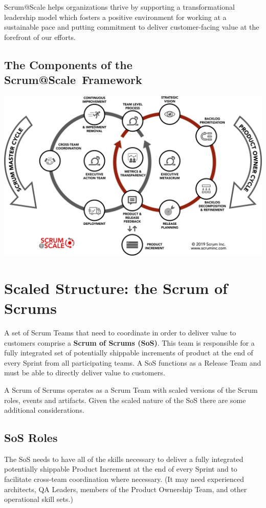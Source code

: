 \documentclass[12pt,a4paper,parskip=full]{scrartcl}
\begin{document}
Scrum@Scale helps organizations thrive by supporting a transformational leadership model which fosters a positive environment for working at a sustainable pace and putting commitment to deliver customer-facing value at the forefront of our efforts.

\subsection{The Components of the Scrum@Scale\textregistered ~Framework}

\includegraphics[width=1.0\linewidth]{SMPO-Cycle.png}

\section{Scaled Structure: the Scrum of Scrums}

A set of Scrum Teams that need to coordinate in order to deliver value to customers comprise a \textbf{Scrum of Scrums (SoS)}. This team is responsible for a fully integrated set of potentially shippable increments of product at the end of every Sprint from all participating teams. A SoS functions as a Release Team and must be able to directly deliver value to customers.

A Scrum of Scrums operates as a Scrum Team with scaled versions of the Scrum roles, events and artifacts. Given the scaled nature of the SoS there are some additional considerations.

\subsection{SoS Roles}

The SoS needs to have all of the skills necessary to deliver a fully integrated potentially shippable Product Increment at the end of every Sprint and to facilitate cross-team coordination where necessary. (It may need experienced architects, QA Leaders, members of the Product Ownership Team, and other operational skill sets.) 
\end{document}
